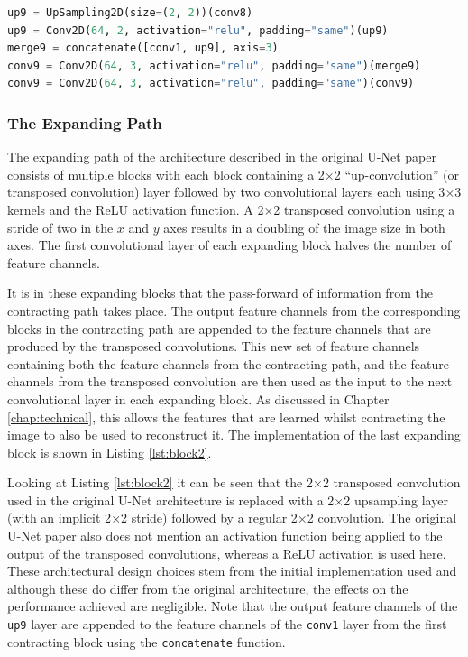 \begin{lstlisting}[float={!t},caption={The implementation of the last expanding block of the U-Net architecture using the Keras functional API.},label={lst:block2},language=Python,upquote=true,belowskip=0pt]
up9 = UpSampling2D(size=(2, 2))(conv8)
up9 = Conv2D(64, 2, activation="relu", padding="same")(up9)
merge9 = concatenate([conv1, up9], axis=3)
conv9 = Conv2D(64, 3, activation="relu", padding="same")(merge9)
conv9 = Conv2D(64, 3, activation="relu", padding="same")(conv9)
\end{lstlisting}
\subsubsection{The Expanding Path}

The expanding path of the architecture described in the original U-Net paper consists of multiple blocks with each block containing a 2$\times$2 ``up-convolution'' (or transposed convolution) layer followed by two convolutional layers each using 3$\times$3 kernels and the ReLU activation function. A 2$\times$2 transposed convolution using a stride of two in the $x$ and $y$ axes results in a doubling of the image size in both axes. The first convolutional layer of each expanding block halves the number of feature channels.

It is in these expanding blocks that the pass-forward of information from the contracting path takes place. The output feature channels from the corresponding blocks in the contracting path are appended to the feature channels that are produced by the transposed convolutions. This new set of feature channels containing both the feature channels from the contracting path, and the feature channels from the transposed convolution are then used as the input to the next convolutional layer in each expanding block. As discussed in Chapter \ref{chap:technical}, this allows the features that are learned whilst contracting the image to also be used to reconstruct it. The implementation of the last expanding block is shown in Listing \ref{lst:block2}.

Looking at Listing \ref{lst:block2} it can be seen that the 2$\times$2 transposed convolution used in the original U-Net architecture is replaced with a 2$\times$2 upsampling layer (with an implicit 2$\times$2 stride) followed by a regular 2$\times$2 convolution. The original U-Net paper also does not mention an activation function being applied to the output of the transposed convolutions, whereas a ReLU activation is used here. These architectural design choices stem from the initial implementation used and although these do differ from the original architecture, the effects on the performance achieved are negligible. Note that the output feature channels of the \texttt{up9} layer are appended to the feature channels of the \texttt{conv1} layer from the first contracting block using the \texttt{concatenate} function.

